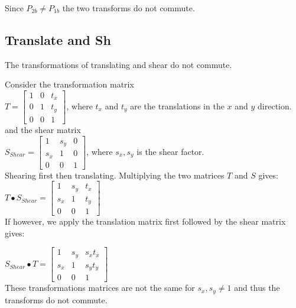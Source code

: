 \documentclass[a4paper,10pt]{scrartcl}
\begin{document}
Since $P_{2b} \neq P_{1b}$ the two transforms do not commute.

\subsection{Translate and Sh}

The transformations of translating and shear do not commute.

Consider the transformation matrix \\

$T = 
\begin{bmatrix}
    1       & 0 & t_x \\
    0       & 1 & t_y \\
    0       & 0 & 1 
\end{bmatrix}
$, where $t_x $ and $t_y$ are the translations in the $x$ and $y$ direction. \\

and the shear matrix \\

$S_{Shear} = \begin{bmatrix}
    1       & s_y & 0 \\
    s_x       & 1 & 0 \\
    0       & 0 & 1     
 \end{bmatrix}
$, where $s_x, s_y$ is the shear factor. \\

Shearing first then translating. Multiplying the two matrices $T$ and $S$ gives: \\

$T \bullet S_{Shear} = \begin{bmatrix}
		  1 & s_y & t_x \\
		  s_x & 1 & t_y \\
		  0 & 0 & 1
               \end{bmatrix}
$ \\

If however, we apply the translation matrix first followed by the shear matrix gives:

$S_{Shear} \bullet T = \begin{bmatrix}
		  1 & s_y & s_xt_x \\
		  s_x & 1 & s_yt_y \\
		  0 & 0 & 1
               \end{bmatrix}
$ \\

These transformations matrices are not the same for $s_x, s_y \neq 1$ and thus the transforms do not commute. \\ 
\end{document}
